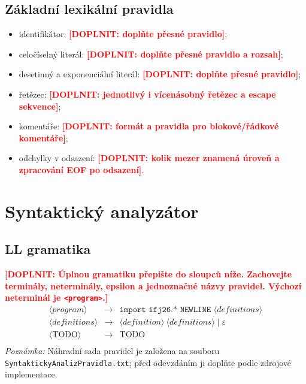 \documentclass[11pt,a4paper]{article}
\newcommand{\placeholder}[1]{\textcolor{red}{\textbf{[DOPLNIT: #1]}}}
\begin{document}
\subsection{Základní lexikální pravidla}
\begin{itemize}
  \item identifikátor: \placeholder{doplňte přesné pravidlo};
  \item celočíselný literál: \placeholder{doplňte přesné pravidlo a rozsah};
  \item desetinný a exponenciální literál: \placeholder{doplňte přesné pravidlo};
  \item řetězec: \placeholder{jednotlivý i vícenásobný řetězec a escape sekvence};
  \item komentáře: \placeholder{formát a pravidla pro blokové/řádkové komentáře};
  \item odchylky v odsazení: \placeholder{kolik mezer znamená úroveň a zpracování EOF po odsazení}.
\end{itemize}

\section{Syntaktický analyzátor}
\subsection{LL gramatika}
\placeholder{Úplnou gramatiku přepište do sloupců níže. Zachovejte terminály, neterminály, epsilon a jednoznačné názvy pravidel. Výchozí neterminál je \texttt{<program>}.}
\[
\begin{array}{rcl}
\langle program\rangle &\to& \texttt{import ifj26.* NEWLINE }\langle definitions\rangle\\
\langle definitions\rangle &\to& \langle definition\rangle\ \langle definitions\rangle\mid\varepsilon\\
\langle \mathrm{TODO}\rangle &\to& \mathrm{TODO}\\
\end{array}
\]
\textit{Poznámka:} Náhradní sada pravidel je založena na souboru
\texttt{SyntaktickyAnalizPravidla.txt}; před odevzdáním ji doplňte podle zdrojové implementace.
\end{document}

